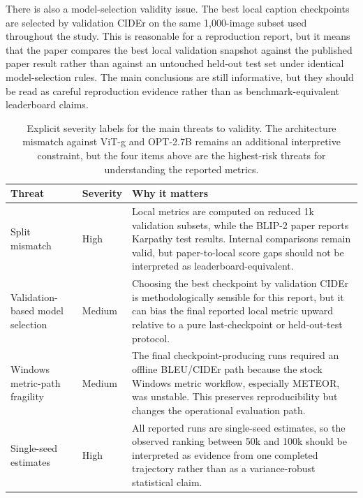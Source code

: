 \documentclass[11pt]{article}
\begin{document}
There is also a model-selection validity issue. The best local caption checkpoints are selected by validation CIDEr on the same 1,000-image subset used throughout the study. This is reasonable for a reproduction report, but it means that the paper compares the best local validation snapshot against the published paper result rather than against an untouched held-out test set under identical model-selection rules. The main conclusions are still informative, but they should be read as careful reproduction evidence rather than as benchmark-equivalent leaderboard claims.

\begin{table}[t]
\centering
\small
\begin{tabularx}{\textwidth}{p{3.0cm} p{1.4cm} Y}
\toprule
Threat & Severity & Why it matters \\
\midrule
Split mismatch & High & Local metrics are computed on reduced 1k validation subsets, while the BLIP-2 paper reports Karpathy test results. Internal comparisons remain valid, but paper-to-local score gaps should not be interpreted as leaderboard-equivalent. \\
Validation-based model selection & Medium & Choosing the best checkpoint by validation CIDEr is methodologically sensible for this report, but it can bias the final reported local metric upward relative to a pure last-checkpoint or held-out-test protocol. \\
Windows metric-path fragility & Medium & The final checkpoint-producing runs required an offline BLEU/CIDEr path because the stock Windows metric workflow, especially METEOR, was unstable. This preserves reproducibility but changes the operational evaluation path. \\
Single-seed estimates & High & All reported runs are single-seed estimates, so the observed ranking between 50k and 100k should be interpreted as evidence from one completed trajectory rather than as a variance-robust statistical claim. \\
\bottomrule
\end{tabularx}
\caption{Explicit severity labels for the main threats to validity. The architecture mismatch against ViT-g and OPT-2.7B remains an additional interpretive constraint, but the four items above are the highest-risk threats for understanding the reported metrics.}
\label{tab:validity-threats}
\end{table}
\end{document}
